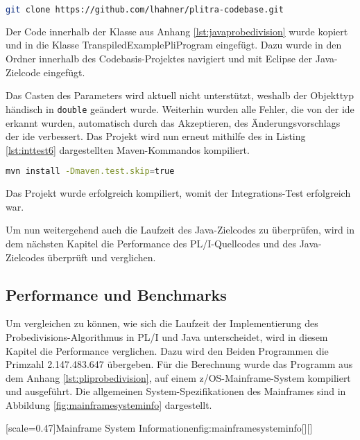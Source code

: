 \begin{lstlisting}[language=Bash, caption=Laden der Code-Basis, label={lst:inttest5}]
git clone https://github.com/lhahner/plitra-codebase.git
\end{lstlisting}

Der Code innerhalb der Klasse aus Anhang \ref{lst:javaprobedivision} wurde kopiert und in die Klasse TranspiledExamplePliProgram eingefügt. Dazu wurde in den Ordner  innerhalb des Codebasis-Projektes navigiert und mit Eclipse der Java-Zielcode eingefügt.

Das Casten des Parameters wird aktuell nicht unterstützt, weshalb der Objekttyp händisch
in \verb+double+ geändert wurde. Weiterhin wurden alle Fehler, die von der \ac{ide} erkannt wurden, automatisch durch das Akzeptieren, des Änderungsvorschlags der  \ac{ide}  verbessert.
Das Projekt wird nun erneut mithilfe des in Listing \ref{lst:inttest6} dargestellten Maven-Kommandos kompiliert.

\begin{lstlisting}[language=Bash, caption=Kompilieren des Projekts, label={lst:inttest6}]
mvn install -Dmaven.test.skip=true
\end{lstlisting}

Das Projekt wurde erfolgreich kompiliert, womit der Integrations-Test erfolgreich war.

Um nun weitergehend auch die Laufzeit des Java-Zielcodes zu überprüfen,
wird in dem nächsten Kapitel die Performance des PL/I-Quellcodes und des Java-Zielcodes überprüft und verglichen. 
\pagebreak

\subsection{Performance und Benchmarks}
Um vergleichen zu können, wie sich die Laufzeit der Implementierung des Probedivisions-Algorithmus in PL/I und Java unterscheidet, wird in diesem Kapitel die Performance verglichen. 
Dazu wird den Beiden Programmen die Primzahl 2.147.483.647 übergeben.
Für die Berechnung wurde das Programm aus dem Anhang \ref{lst:pliprobedivision}, auf einem z/OS-Mainframe-System kompiliert und ausgeführt. 
Die allgemeinen System-Spezifikationen des Mainframes sind in Abbildung \ref{fig:mainframesysteminfo} dargestellt.

[scale=0.47]{Mainframe System Informationen}{fig:mainframesysteminfo}[][]

